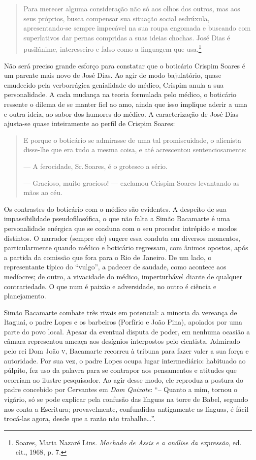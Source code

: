 \begin{quote}
Para merecer alguma consideração não só aos olhos dos outros, mas aos
seus próprios, busca compensar sua situação social esdrúxula,
apresentando-se sempre impecável na sua roupa engomada e buscando com
superlativos dar pernas compridas a suas ideias chochas. José Dias é
pusilânime, interesseiro e falso como a linguagem que usa.\footnote{Soares,
  Maria Nazaré Lins. \emph{Machado de Assis e a análise da expressão},
  ed. cit., 1968, p. 7.}
\end{quote}

Não será preciso grande esforço para constatar que o boticário Crispim
Soares é um parente mais novo de José Dias. Ao agir de modo bajulatório,
quase emudecido pela verborrágica genialidade do médico, Crispim anula a
sua personalidade. A cada mudança na teoria formulada pelo médico, o
boticário ressente o dilema de se manter fiel ao amo, ainda que isso
implique aderir a uma e outra ideia, ao sabor dos humores do médico. A
caracterização de José Dias ajusta-se quase inteiramente ao perfil de
Crispim Soares:

\begin{quote}
E porque o boticário se admirasse de uma tal promiscuidade, o alienista
disse-lhe que era tudo a mesma coisa, e até acrescentou
sentenciosamente:

--- A ferocidade, Sr.\,Soares, é o grotesco a sério.

--- Gracioso, muito gracioso! --- exclamou Crispim Soares levantando as
mãos ao céu.
\end{quote}

Os contrastes do boticário com o médico são evidentes. A despeito de sua
impassibilidade pseudofilosófica, o que não falta a Simão Bacamarte é
uma personalidade enérgica que se coaduna com o seu proceder intrépido e
modos distintos. O narrador (sempre ele) sugere essa conduta em diversos
momentos, particularmente quando médico e boticário regressam, com
ânimos opostos, após a partida da comissão que fora para o Rio de
Janeiro. De um lado, o representante típico do ``vulgo'', a padecer de
saudade, como acontece aos medíocres; de outro, a vivacidade do médico,
imperturbável diante de qualquer contrariedade. O que num é paixão e
adversidade, no outro é ciência e planejamento.

Simão Bacamarte combate três rivais em potencial: a minoria da vereança
de Itaguaí, o padre Lopes e os barbeiros (Porfírio e João Pina),
apoiados por uma parte do povo local. Apesar da eventual disputa de
poder, em nenhuma ocasião a câmara representou ameaça aos desígnios
interpostos pelo cientista. Admirado pelo rei Dom João \textsc{v}, Bacamarte
recorreu à tribuna para fazer valer a sua força e autoridade. Por sua
vez, o padre Lopes ocupa lugar intermediário: habituado ao púlpito, fez
uso da palavra para se contrapor aos pensamentos e atitudes que ocorriam
ao ilustre pesquisador. Ao agir desse modo, ele reproduz a postura do
padre concebido por Cervantes em \emph{Dom Quixote}: ``-- Quanto a mim,
tornou o vigário, só se pode explicar pela confusão das línguas na torre
de Babel, segundo nos conta a Escritura; provavelmente, confundidas
antigamente as línguas, é fácil trocá-las agora, desde que a razão não
trabalhe\ldots{}''.

